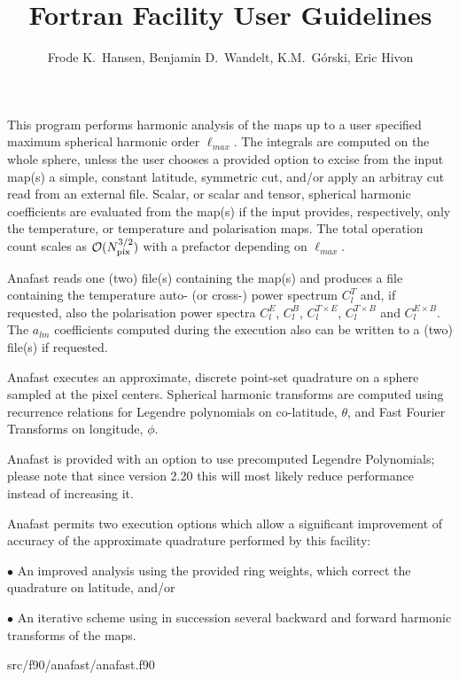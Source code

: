 
\sloppy


\title{\healpix Fortran Facility User Guidelines}
 \section[anafast]{\nosectionname}
\label{fac:anafast}
\author{Frode K.~Hansen, Benjamin D.~Wandelt, K.M.~G\'orski, Eric Hivon}

\begin{facility}
{This program performs harmonic analysis of the \healpix maps 
up to a user
specified maximum spherical harmonic order $\ell_{max}$.
The integrals are computed on the whole sphere, unless the user 
chooses  a provided option 
to excise from the input map(s) a simple, constant latitude, symmetric cut, and/or
apply an arbitray cut read from an external file.
Scalar, or scalar and tensor, spherical harmonic coefficients are evaluated
from the map(s) if the input provides, respectively, only the temperature,
or temperature and polarisation maps.
The total operation count scales as 
${\cal {O}}(N_{\rm pix}^{3/2} )$ with a prefactor
depending on $\ell_{max}$. 

Anafast reads one (two) file(s) containing the map(s) and produces 
a file containing the temperature auto- (or cross-) power spectrum
$C^T_l$ and, if requested, 
also the polarisation power spectra $C^E_l$, $C^B_l$, $C^{T\times E}_l$,
$C^{T\times B}_l$ and $C^{E\times B}_l$.
The $a_{lm}$  coefficients computed during the execution also can be  
written to a (two) file(s) if requested. 

Anafast executes an approximate, discrete point-set quadrature on 
a sphere
sampled at the \healpix pixel centers.
Spherical harmonic transforms are computed 
using recurrence relations for Legendre polynomials on co-latitude, 
$\theta$, 
and  Fast Fourier Transforms on longitude, $\phi$. 

Anafast is provided with an option to use precomputed Legendre Polynomials;
please note that since version 2.20 this will most likely reduce performance
instead of increasing it.

Anafast permits two execution options 
which allow a significant improvement of accuracy of 
the approximate quadrature performed by this facility:

$\bullet$ An improved analysis using the provided ring weights, 
which correct the quadrature
on latitude, and/or
 
$\bullet$ An iterative scheme using in 
succession several backward and forward harmonic transforms 
of the maps.} 
{src/f90/anafast/anafast.f90}
\end{facility}

